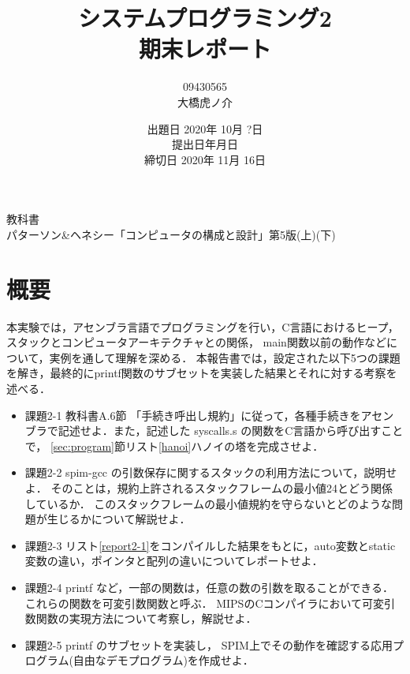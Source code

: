 \documentclass[11pt]{jarticle}
\begin{document}
\title{システムプログラミング2\\期末レポート}
\author{09430565\\大橋虎ノ介}
\date{出題日 2020年 10月 ?日\\
提出日\number\year 年\number\month 月\number\day 日\\
締切日 2020年 11月 16日}

\maketitle
\begin{center}
教科書\\
 パターソン\&ヘネシー「コンピュータの構成と設計」第5版(上)(下)
\end{center}
\newpage

\section{概要} \label{sec:abstract}

本実験では，アセンブラ言語でプログラミングを行い，C言語におけるヒープ，
スタックとコンピュータアーキテクチャとの関係， main関数以前の動作などについて，実例を通して理解を深める．
本報告書では，設定された以下5つの課題を解き，最終的にprintf関数のサブセットを実装した結果とそれに対する考察を述べる．

\begin{itemize}
  \item 課題2-1 教科書A.6節 「手続き呼出し規約」に従って，各種手続きをアセンブラで記述せよ．また，記述した syscalls.s の関数をC言語から呼び出すことで， \ref{sec:program}節リスト\ref{hanoi}ハノイの塔を完成させよ．
  \item 課題2-2 spim-gcc の引数保存に関するスタックの利用方法について，説明せよ． そのことは，規約上許されるスタックフレームの最小値24とどう関係しているか． このスタックフレームの最小値規約を守らないとどのような問題が生じるかについて解説せよ．
  \item 課題2-3 リスト\ref{report2-1}をコンパイルした結果をもとに，auto変数とstatic変数の違い，ポインタと配列の違いについてレポートせよ．
  \item 課題2-4 printf など，一部の関数は，任意の数の引数を取ることができる． これらの関数を可変引数関数と呼ぶ． MIPSのCコンパイラにおいて可変引数関数の実現方法について考察し，解説せよ．
  \item 課題2-5 printf のサブセットを実装し， SPIM上でその動作を確認する応用プログラム(自由なデモプログラム)を作成せよ．
\end{itemize}
\end{document}
